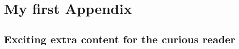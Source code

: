 \chapter{My first Appendix}\label{sec:my_first_appendix_section}
\section{Exciting extra content for the curious reader}